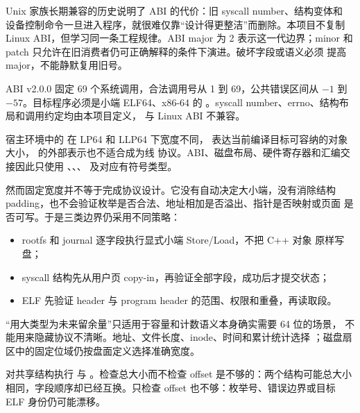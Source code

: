 Unix 家族长期兼容的历史说明了 ABI 的代价：旧 syscall number、结构变体和
设备控制命令一旦进入程序，就很难仅靠“设计得更整洁”而删除。本项目不复制
Linux ABI，但学习同一条工程规律。ABI major 为 2 表示这一代边界；minor
和 patch 只允许在旧消费者仍可正确解释的条件下演进。破坏字段或语义必须
提高 major，不能静默复用旧号。

\begin{contractbox}
ABI v2.0.0 固定 69 个系统调用，合法调用号从 1 到 69，公共错误区间从
\(-1\) 到 \(-57\)。目标程序必须是小端 ELF64、x86-64 的
。syscall number、errno、结构布局和调用约定均由本项目定义，
与 Linux ABI 不兼容。
\end{contractbox}

宿主环境中的  在 LP64 和 LLP64 下宽度不同，
表达当前编译目标可容纳的对象大小， 的外部表示也不适合成为线
协议。ABI、磁盘布局、硬件寄存器和汇编交接因此只使用
、、、
 及对应有符号类型。

然而固定宽度并不等于完成协议设计。它没有自动决定大小端，没有消除结构
padding，也不会验证枚举是否合法、地址相加是否溢出、指针是否映射或页面
是否可写。于是三类边界仍采用不同策略：

\begin{itemize}[leftmargin=2em]
  \item rootfs 和 journal 逐字段执行显式小端 Store/Load，不把 C++ 对象
        原样写盘；
  \item syscall 结构先从用户页 copy-in，再验证全部字段，成功后才提交状态；
  \item ELF 先验证 header 与 program header 的范围、权限和重叠，再读取段。
\end{itemize}

“用大类型为未来留余量”只适用于容量和计数语义本身确实需要 64 位的场景，
不能用来隐藏协议不清晰。地址、文件长度、inode、时间和累计统计选择
；磁盘扇区中的固定位域仍按盘面定义选择准确宽度。

 对共享结构执行
 与 。检查总大小而不检查 offset
是不够的：两个结构可能总大小相同，字段顺序却已经互换。只检查 offset
也不够：枚举号、错误边界或目标 ELF 身份仍可能漂移。

